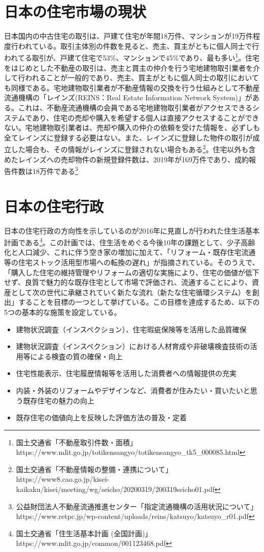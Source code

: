 \documentclass[a4paper,fontsize=11pt,report,notitlepage,line_length=38zw,number_of_lines=40]{jlreq}
\begin{document}
\section{日本の住宅市場の現状}
日本国内の中古住宅の取引は、戸建て住宅が年間18万件、マンションが19万件程度行われている。取引主体別の件数を見ると、売主、買主がともに個人同士で行われてる取引が、戸建て住宅で53\%、マンションで45\%であり、最も多い\footnote{国土交通省「不動産取引件数・面積」https://www.mlit.go.jp/totikensangyo/totikensangyo\_tk5\_000085.html}。住宅をはじめとした不動産の取引は、売主と買主の仲介を行う宅地建物取引業者を介して行われることが一般的であり、売主、買主がともに個人同士の取引においても同様である。宅地建物取引業者が不動産情報の交換を行う仕組みとして不動産流通機構の「レインズ(REINS：Real Estate Information Network System)」がある。これは、不動産流通機構の会員である宅地建物取引業者がアクセスできるシステムであり、住宅の売却や購入を希望する個人は直接アクセスすることができない。宅地建物取引業者は、売却や購入の仲介の依頼を受けた情報を、必ずしも全てレインズに登録する必要はない。また、レインズに登録した物件の取引が成立した場合も、その情報がレインズに登録されない場合もある\footnote{国土交通省「不動産情報の整備・連携について」https://www8.cao.go.jp/kisei-kaikaku/kisei/meeting/wg/seicho/20200319/200319seicho01.pdf}。住宅以外も含めたレインズへの売却物件の新規登録件数は、2019年が169万件であり、成約報告件数は18万件である\footnote{公益財団法人不動産流通推進センター「指定流通機構の活用状況について」https://www.retpc.jp/wp-content/uploads/reins/katsuyo/katsuyo\_r01.pdf}

\section{日本の住宅行政}
日本の住宅行政の方向性を示しているのが2016年に見直しが行われた住生活基本計画である\footnote{国土交通省「住生活基本計画 (全国計画)」https://www.mlit.go.jp/common/001123468.pdf}。この計画では、住生活をめぐる今後10年の課題として、少子高齢化と人口減少、これに伴う空き家の増加に加えて、「リフォーム・既存住宅流通等の住宅ストック活用型市場への転換の遅れ」が指摘されている。そのうえで、「購入した住宅の維持管理やリフォームの適切な実施により、住宅の価値が低下せず、良質で魅力的な既存住宅として市場で評価され、流通することにより、資産として次の世代に承継されていく新たな流れ（新たな住宅循環システム）を創出」することを目標の一つとして挙げている。この目標を達成するため、以下の5つの基本的な施策を設定している。
\begin{itemize}
\item 建物状況調査（インスペクション）、住宅瑕疵保険等を活用した品質確保
\item 建物状況調査（インスペクション）における人材育成や非破壊検査技術の活用等による検査の質の確保・向上
\item 住宅性能表示、住宅履歴情報等を活用した消費者への情報提供の充実
\item 内装・外装のリフォームやデザインなど、消費者が住みたい・買いたいと思う既存住宅の魅力の向上
\item 既存住宅の価値向上を反映した評価方法の普及・定着
\end{itemize}
\end{document}
